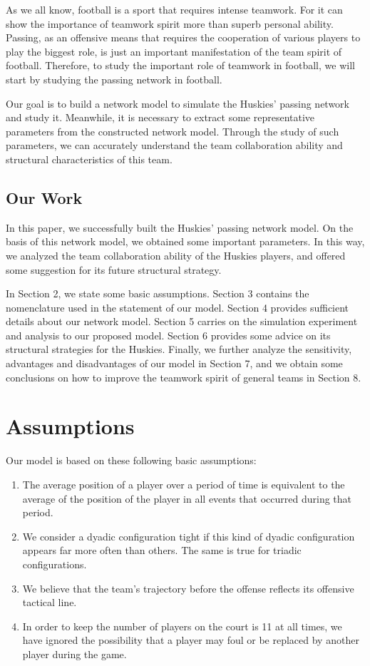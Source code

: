 \documentclass{mcmthesis}
\begin{document}
	As we all know, football is a sport that requires intense teamwork.  For it can show the importance of teamwork spirit more than superb personal ability.  Passing, as an offensive means that requires the cooperation of various players to play the biggest role, is just an important manifestation of the team spirit of football.  Therefore, to study the important role of teamwork in football, we will start by studying the passing network in football.

	Our goal is to build a network model to simulate the Huskies' passing network and study it.  Meanwhile, it is necessary to extract some representative parameters from the constructed network model.  Through the study of such parameters, we can accurately understand the team collaboration ability and structural characteristics of this team.
\subsection{Our Work}
	In this paper, we successfully built the Huskies' passing network model.  On the basis of this network model, we obtained some important parameters. In this way, we analyzed the team collaboration ability of the Huskies players, and offered some suggestion for its future structural strategy.

	In Section 2, we state some basic assumptions.  Section 3 contains the nomenclature used in the statement of our model.  Section 4 provides sufficient details about our network model.  Section 5 carries on the simulation experiment and analysis to our proposed model.  Section 6 provides some advice on its structural strategies for the Huskies.  Finally, we further analyze the sensitivity, advantages and disadvantages of our model in Section 7, and we obtain some conclusions on how to improve the teamwork spirit of general teams in Section 8.
\section{Assumptions}
	Our model is based on these following basic assumptions:
	\begin{enumerate}
		\item The average position of a player over a period of time is equivalent to the average of the position of the player in all events that occurred during that period.
		\item We consider a dyadic configuration tight if this kind of dyadic configuration appears far more often than others.  The same is true for triadic configurations.
		\item We believe that the team's trajectory before the offense reflects its offensive tactical line.
		\item In order to keep the number of players on the court is 11 at all times, we have ignored the possibility that a player may foul or be replaced by another player during the game.
	\end{enumerate}
\end{document}

